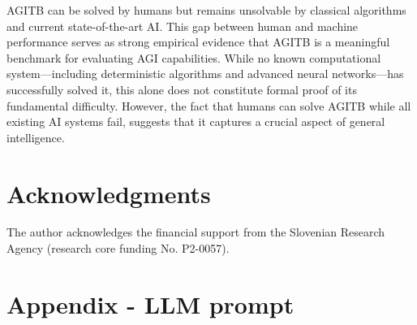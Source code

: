 \documentclass{article}
\begin{document}
AGITB can be solved by humans but remains unsolvable by classical algorithms and current state-of-the-art AI. This gap between human and machine performance serves as strong empirical evidence that AGITB is a meaningful benchmark for evaluating AGI capabilities. While no known computational system—including deterministic algorithms and advanced neural networks—has successfully solved it, this alone does not constitute formal proof of its fundamental difficulty. However, the fact that humans can solve AGITB while all existing AI systems fail, suggests that it captures a crucial aspect of general intelligence.

\section*{Acknowledgments}
The author acknowledges the financial support from the Slovenian Research Agency (research core funding No. P2-0057).

\newpage

\appendix
\section*{Appendix - LLM prompt}
\end{document}

